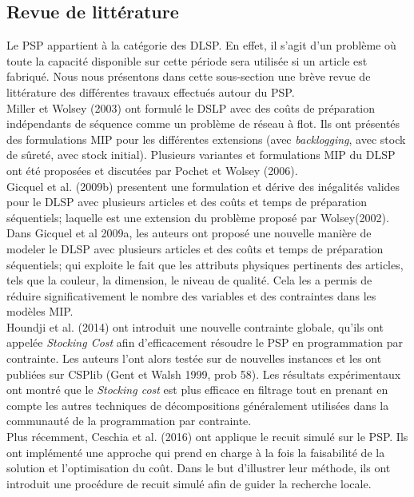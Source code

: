 \documentclass[12pt,a4paper]{article}
\begin{document}
	\subsection{Revue de littérature}
	Le PSP appartient à la catégorie des DLSP. En effet, il s'agit d'un problème où toute la capacité disponible sur cette période sera utilisée si un article est fabriqué. Nous nous présentons dans cette sous-section une brève revue de littérature des différentes travaux effectués autour du PSP. \\
	\hspace*{.5cm} Miller et Wolsey (2003) ont formulé le DSLP avec des coûts de préparation indépendants de séquence comme un problème de réseau à flot. Ils ont présentés des formulations MIP pour les différentes extensions (avec \emph{backlogging}, avec stock de sûreté, avec stock initial). Plusieurs variantes et formulations MIP du DLSP ont été proposées et discutées par Pochet et Wolsey (2006). \\
	\hspace*{.5cm} Gicquel et al. (2009b) presentent une formulation et dérive des inégalités valides pour le DLSP avec plusieurs articles et des coûts et temps de préparation séquentiels; laquelle est une extension du problème proposé par Wolsey(2002). Dans Gicquel et al 2009a, les auteurs ont proposé une nouvelle manière de modeler le DLSP avec plusieurs articles et des coûts et temps de préparation séquentiels; qui exploite le fait que les attributs physiques pertinents des articles, tels que la couleur, la dimension, le niveau de qualité. Cela les a permis de réduire significativement le nombre des variables et des contraintes dans les modèles MIP.\\
	\hspace*{.5cm}Houndji et al. (2014) ont introduit une nouvelle contrainte globale, qu'ils ont appelée \emph{Stocking Cost} afin d'efficacement résoudre le PSP en programmation par contrainte. Les auteurs l'ont alors testée sur de nouvelles instances et les ont publiées sur CSPlib (Gent et Walsh 1999, prob 58). Les résultats expérimentaux ont montré que le \emph{Stocking cost} est plus efficace en filtrage tout en prenant en compte les autres techniques de décompositions généralement utilisées dans la communauté de la programmation par contrainte. \\
	\hspace*{.5cm} Plus récemment, Ceschia et al. (2016) ont applique le recuit simulé sur le PSP. Ils ont implémenté une approche qui prend en charge à la fois la faisabilité de la solution et l'optimisation du coût. Dans le but d'illustrer leur méthode, ils ont introduit une procédure de recuit simulé afin de guider la recherche locale.
	 
\end{document}
